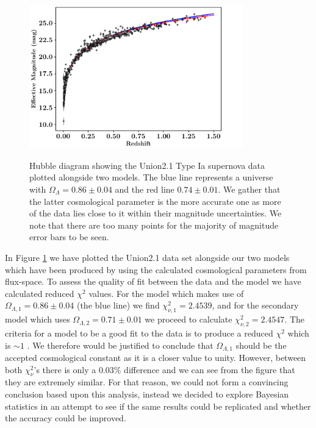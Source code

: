 \documentclass[twocolumn]{revtex4}
\begin{document}
{\begin{figure}[!h]
\begin{center}
\includegraphics[width=9.25cm]{results/hubble_diagram}
\vspace{-3ex}
\caption[]{Hubble diagram showing the Union2.1 Type Ia supernova data plotted alongside two models. The blue line represents a universe with $\Omega_\Lambda=0.86\pm0.04$ and the red line $0.74\pm0.01$. We gather that the latter cosmological parameter is the more accurate one as more of the data lies close to it within their magnitude uncertainties. We note that there are too many points for the majority of magnitude error bars to be seen.}
\vspace{-3ex}
\label{fig:hubble_diagram}
\end{center}
\end{figure}

In Figure \ref{fig:hubble_diagram} we have plotted the Union2.1 data set alongside our two models which have been produced by using the calculated cosmological parameters from flux-space. To assess the quality of fit between the data and the model we have calculated reduced $\chi^2$ values. For the model which makes use of $\Omega_{\Lambda,1}=0.86\pm0.04$ (the blue line) we find $\chi^2_{\nu,1}=2.4539$, and for the secondary model which uses $\Omega_{\Lambda,2}=0.71\pm0.01$ we proceed to calculate $\chi^2_{\nu,2}=2.4547$. The criteria for a model to be a good fit to the data is to produce a reduced $\chi^2$ which is $\sim1$ \cite{hugheshase}. We therefore would be justified to conclude that $\Omega_{\Lambda,1}$ should be the accepted cosmological constant as it is a closer value to unity.  However, between both $\chi^2_\nu$'s there is only a $0.03\%$ difference and we can see from the figure that they are extremely similar. For that reason, we could not form a convincing conclusion based upon this analysis, instead we decided to explore Bayesian statistics in an attempt to see if the same results could be replicated and whether the accuracy could be improved.

}
\end{document}
